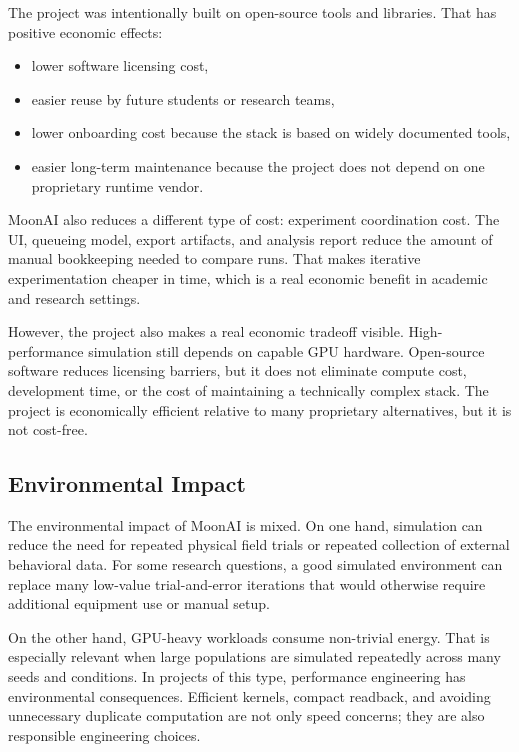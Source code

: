 The project was intentionally built on open-source tools and libraries. That has positive
economic effects:

\begin{itemize}[nosep]
  \item lower software licensing cost,
  \item easier reuse by future students or research teams,
  \item lower onboarding cost because the stack is based on widely documented tools,
  \item easier long-term maintenance because the project does not depend on one proprietary
    runtime vendor.
\end{itemize}

MoonAI also reduces a different type of cost: experiment coordination cost. The UI, queueing
model, export artifacts, and analysis report reduce the amount of manual bookkeeping needed to
compare runs. That makes iterative experimentation cheaper in time, which is a real economic
benefit in academic and research settings.

However, the project also makes a real economic tradeoff visible. High-performance simulation
still depends on capable GPU hardware. Open-source software reduces licensing barriers, but it
does not eliminate compute cost, development time, or the cost of maintaining a technically
complex stack. The project is economically efficient relative to many proprietary alternatives,
but it is not cost-free.

\subsection{Environmental Impact}

The environmental impact of MoonAI is mixed. On one hand, simulation can reduce the need for
repeated physical field trials or repeated collection of external behavioral data. For some
research questions, a good simulated environment can replace many low-value trial-and-error
iterations that would otherwise require additional equipment use or manual setup.

On the other hand, GPU-heavy workloads consume non-trivial energy. That is especially relevant
when large populations are simulated repeatedly across many seeds and conditions. In projects of
this type, performance engineering has environmental consequences. Efficient kernels, compact
readback, and avoiding unnecessary duplicate computation are not only speed concerns; they are
also responsible engineering choices.

